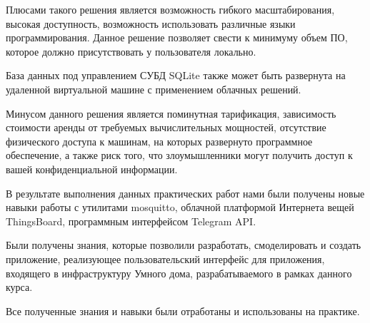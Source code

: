 \documentclass[a4paper,14pt]{extarticle}
\begin{document}
Плюсами такого решения является возможность гибкого масштабирования, высокая доступность, возможность использовать различные языки программирования. Данное решение позволяет свести к минимуму объем ПО, которое должно присутствовать у пользователя локально.

База данных под управлением СУБД SQLite также может быть развернута на удаленной виртуальной машине с применением облачных решений. 

Минусом данного решения является поминутная тарификация, зависимость стоимости аренды от требуемых вычислительных мощностей, отсутствие физического доступа к машинам, на которых развернуто программное обеспечение, а также риск того, что злоумышленники могут получить доступ к вашей конфиденциальной информации.  

\newpage
{}

В результате выполнения данных практических работ нами были получены новые навыки работы с утилитами mosquitto, облачной платформой Интернета вещей ThingsBoard, программным интерфейсом Telegram API. 

Были получены знания, которые позволили разработать, смоделировать и создать приложение, реализующее пользовательский интерфейс для приложения, входящего в инфраструктуру Умного дома, разрабатываемого в рамках данного курса.


Все полученные знания и навыки были отработаны и использованы на практике.
\end{document}
